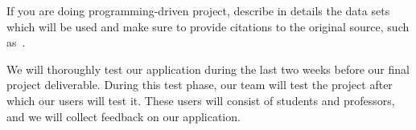 \documentclass{article}
\begin{document}
If you are doing programming-driven project, describe in details the data sets which will be used and make sure to provide citations to the original source, such as~\cite{knuthwebsite}. 

We will thoroughly test our application during the last two weeks before our final project deliverable. During this test phase, our team will test the project after which our users will test it. These users will consist of students and professors, and we will collect feedback on our application. 

 

\end{document}
